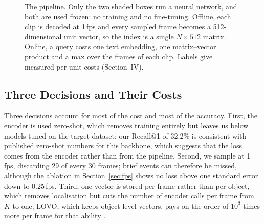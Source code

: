 \documentclass[journal]{IEEEtran}
\begin{document}
\begin{figure}[t]
\centering
{}
\caption{The pipeline. Only the two shaded boxes run a neural network, and both are used
frozen: no training and no fine-tuning. Offline, each clip is decoded at 1\,fps and every
sampled frame becomes a 512-dimensional unit vector, so the index is a single $N\times512$
matrix. Online, a query costs one text embedding, one matrix--vector product and a max over
the frames of each clip. Labels give measured per-unit costs (Section~IV).}
\label{fig:pipeline}
\end{figure}

\subsection{Three Decisions and Their Costs}
Three decisions account for most of the cost and most of the accuracy. First, the encoder is
used zero-shot, which removes training entirely but leaves us below models tuned on the target
dataset; our Recall@1 of 32.2\% is consistent with published zero-shot numbers for this
backbone, which suggests that the loss comes from the encoder rather than from the pipeline.
Second, we sample at 1\,fps, discarding 29 of every 30 frames; brief events can therefore be
missed, although the ablation in Section~\ref{sec:fps} shows no loss above one standard error
down to 0.25\,fps. Third, one vector is stored per frame rather than per object, which removes
localisation but cuts the number of encoder calls per frame from $K$ to one; LOVO, which keeps
object-level vectors, pays on the order of $10^{3}$ times more per frame for that ability
\cite{lovo2025}.
\end{document}
